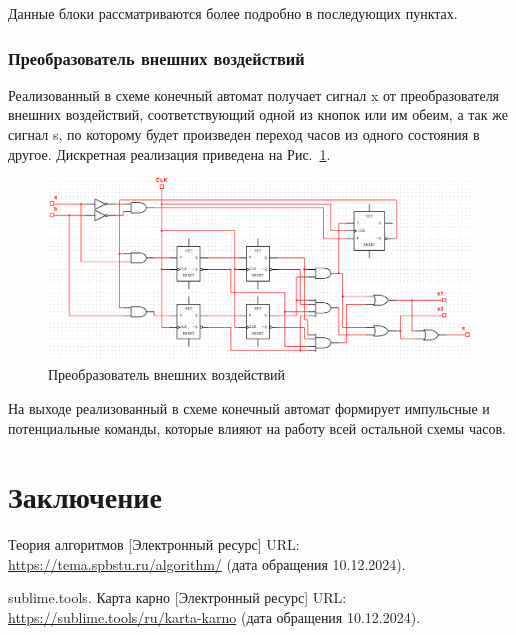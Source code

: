 \documentclass[a4paper, final]{article}
\begin{document}
Данные блоки рассматриваются более подробно в последующих пунктах.

\subsubsection{Преобразователь внешних воздействий}
Реализованный в схеме конечный автомат получает сигнал x от преобразователя внешних воздействий, соответствующий одной из кнопок или им обеим, а так же сигнал s, по которому будет произведен переход часов из одного состояния в другое. Дискретная реализация приведена на Рис.~\ref{img:EIC}. 

\begin{figure}[H]
   \centering
   \includegraphics[width=\linewidth]{EIC.png}
   \caption{Преобразователь внешних воздействий}
   \label{img:EIC}
\end{figure}

На выходе реализованный в схеме конечный автомат формирует импульсные и потенциальные команды, которые влияют на работу всей остальной схемы часов.


\cleardoublepage
{}
\newpage
{}
\section*{Заключение}


\cleardoublepage
{}
\newpage
\begin{thebibliography}{0}
	Теория алгоритмов [Электронный ресурс] URL: \url{https://tema.spbstu.ru/algorithm/} (дата обращения 10.12.2024).

	sublime.tools. Карта карно [Электронный ресурс] URL: \url{https://sublime.tools/ru/karta-karno} (дата обращения 10.12.2024).
\end{thebibliography}
\end{document}

